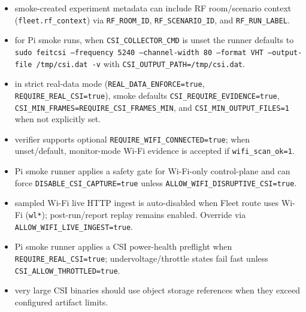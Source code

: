 \documentclass[11pt,a4paper]{article}
\begin{document}
\begin{itemize}
  \item smoke-created experiment metadata can include RF room/scenario context (\texttt{fleet.rf\_context}) via \texttt{RF\_ROOM\_ID}, \texttt{RF\_SCENARIO\_ID}, and \texttt{RF\_RUN\_LABEL}.
  \item for Pi smoke runs, when \texttt{CSI\_COLLECTOR\_CMD} is unset the runner defaults to \texttt{sudo feitcsi --frequency 5240 --channel-width 80 --format VHT --output-file /tmp/csi.dat -v} with \texttt{CSI\_OUTPUT\_PATH=/tmp/csi.dat}.
  \item in strict real-data mode (\texttt{REAL\_DATA\_ENFORCE=true}, \texttt{REQUIRE\_REAL\_CSI=true}), smoke defaults \texttt{CSI\_REQUIRE\_EVIDENCE=true}, \texttt{CSI\_MIN\_FRAMES=REQUIRE\_CSI\_FRAMES\_MIN}, and \texttt{CSI\_MIN\_OUTPUT\_FILES=1} when not explicitly set.
  \item verifier supports optional \texttt{REQUIRE\_WIFI\_CONNECTED=true}; when unset/default, monitor-mode Wi-Fi evidence is accepted if \texttt{wifi\_scan\_ok=1}.
  \item Pi smoke runner applies a safety gate for Wi-Fi-only control-plane and can force \texttt{DISABLE\_CSI\_CAPTURE=true} unless \texttt{ALLOW\_WIFI\_DISRUPTIVE\_CSI=true}.
  \item sampled Wi-Fi live HTTP ingest is auto-disabled when Fleet route uses Wi-Fi (\texttt{wl*}); post-run/report replay remains enabled. Override via \texttt{ALLOW\_WIFI\_LIVE\_INGEST=true}.
  \item Pi smoke runner applies a CSI power-health preflight when \texttt{REQUIRE\_REAL\_CSI=true}; undervoltage/throttle states fail fast unless \texttt{CSI\_ALLOW\_THROTTLED=true}.
  \item very large CSI binaries should use object storage references when they exceed configured artifact limits.
\end{itemize}
\end{document}
